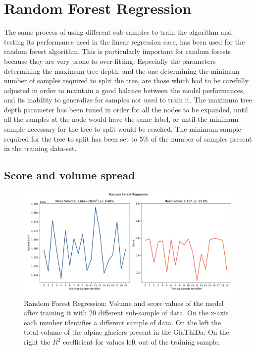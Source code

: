 \section{Random Forest Regression}\label{rfr}
The same process of using different sub-samples to train the algorithm and testing its performance used in the linear regression case, has been used for the random forest algorithm. This is particularly important for random forests because they are very prone to over-fitting. Especially the parameters determining the maximum tree depth, and the one determining the minimum number of samples required to split the tree, are those which had to be carefully adjusted in order to maintain a good balance between the model performances, and its inability to generalize for samples not used to train it. The maximum tree depth parameter has been tuned in order for all the nodes to be expanded, until all the samples at the node would have the same label, or until the minimum sample necessary for the tree to split would be reached. The minimum sample required for the tree to split has been set to 5\% of the number of samples present in the training data-set.  

\subsection{Score and volume spread}\label{rfr-score}

\begin{figure}[!tp]
	\centering		  
	\includegraphics[width=1.\textwidth]{figures/RFR_score.pdf}
	\caption{Random Forest Regression: Volume and score values of the model after training it with 20 different sub-sample of data. On the x-axis each number identifies a different sample of data. On the left the total volume of the alpine glaciers present in the GlaThiDa. On the right the $R^2$ coefficient for values left out of the training sample.}
	\label{fig:rfr-score}
\end{figure}

